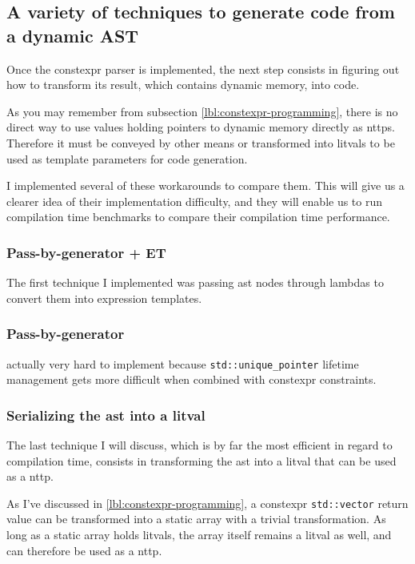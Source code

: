 \documentclass[../main]{subfiles}
\begin{document}
\subsection{
  A variety of techniques to generate code from a dynamic AST
}

Once the \gls{constexpr} parser is implemented, the next step consists in
figuring out how to transform its result, which contains dynamic memory,
into \cpp code.

As you may remember from subsection \ref{lbl:constexpr-programming},
there is no direct way to use values holding pointers to dynamic memory
directly as \glspl{nttp}.
Therefore it must be conveyed by other means or transformed into \glspl{litval}
to be used as template parameters for \cpp code generation.

I implemented several of these workarounds to compare them.
This will give us a clearer idea of their implementation difficulty,
and they will enable us to run compilation time benchmarks to compare their
compilation time performance.

\subsubsection{Pass-by-generator + ET}

The first technique I implemented was passing \gls{ast} nodes through lambdas
to convert them into expression templates.

\subsubsection{Pass-by-generator}

actually very hard to implement because \lstinline{std::unique_pointer}
lifetime management gets more difficult when combined with
\gls{constexpr} constraints.


\subsubsection{Serializing the \gls{ast} into a \gls{litval}}

The last technique I will discuss, which is by far the most efficient
in regard to compilation time, consists in transforming the \gls{ast} into a
\gls{litval} that can be used as a \gls{nttp}.

As I've discussed in \ref{lbl:constexpr-programming}, a \gls{constexpr}
\lstinline{std::vector} return value can be transformed into a static array with
a trivial transformation. As long as a static array holds \glspl{litval},
the array itself remains a \gls{litval} as well, and can therefore be used
as a \gls{nttp}.
\end{document}
